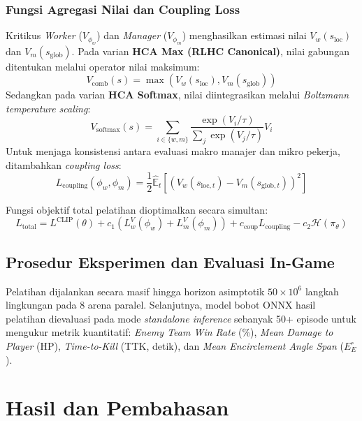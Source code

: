 \documentclass[conference]{IEEEtran}
\begin{document}
\subsubsection{Fungsi Agregasi Nilai dan Coupling Loss}
Kritikus \textit{Worker} (\(V_{\phi_w}\)) dan \textit{Manager} (\(V_{\phi_m}\)) menghasilkan estimasi nilai \(V_w(s_{\text{loc}})\) dan \(V_m(s_{\text{glob}})\). Pada varian \textbf{HCA Max (RLHC Canonical)}, nilai gabungan ditentukan melalui operator nilai maksimum:
\begin{equation}
V_{\text{comb}}(s) = \max \left( V_w(s_{\text{loc}}), V_m(s_{\text{glob}}) \right)
\end{equation}
Sedangkan pada varian \textbf{HCA Softmax}, nilai diintegrasikan melalui \textit{Boltzmann temperature scaling}:
\begin{equation}
V_{\text{softmax}}(s) = \sum_{i \in \{w, m\}} \frac{\exp(V_i / \tau)}{\sum_{j} \exp(V_j / \tau)} V_i
\end{equation}
Untuk menjaga konsistensi antara evaluasi makro manajer dan mikro pekerja, ditambahkan \textit{coupling loss}:
\begin{equation}
L_{\text{coupling}}(\phi_w, \phi_m) = \frac{1}{2} \hat{\mathbb{E}}_t \left[ \left( V_w(s_{\text{loc}, t}) - V_m(s_{\text{glob}, t}) \right)^2 \right]
\end{equation}

Fungsi objektif total pelatihan dioptimalkan secara simultan:
\begin{equation}
L_{\text{total}} = L^{\text{CLIP}}(\theta) + c_1 \left( L^V_w(\phi_w) + L^V_m(\phi_m) \right) + c_{\text{coup}} L_{\text{coupling}} - c_2 \mathcal{H}(\pi_\theta)
\end{equation}

\subsection{Prosedur Eksperimen dan Evaluasi In-Game}
Pelatihan dijalankan secara masif hingga horizon asimptotik \(50 \times 10^6\) langkah lingkungan pada 8 arena paralel. Selanjutnya, model bobot \(\text{ONNX}\) hasil pelatihan dievaluasi pada mode \textit{standalone inference} sebanyak 50+ episode untuk mengukur metrik kuantitatif: \textit{Enemy Team Win Rate} (\%), \textit{Mean Damage to Player} (HP), \textit{Time-to-Kill} (TTK, detik), dan \textit{Mean Encirclement Angle Span} (\(E_E^\circ\)).

\section{Hasil dan Pembahasan}
\end{document}
